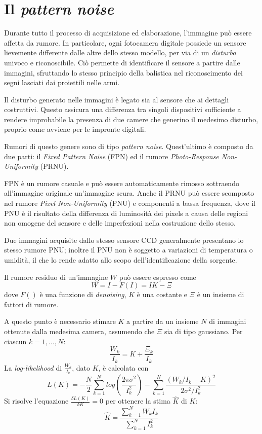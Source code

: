 \section{Il \emph{pattern noise}}

Durante tutto il processo di acquisizione ed elaborazione, l'immagine può essere affetta da rumore. 
In particolare, ogni fotocamera digitale possiede un sensore
lievemente differente dalle altre dello stesso modello, per via di un \emph{disturbo}
univoco e riconoscibile. Ciò permette di identificare il sensore a partire dalle
immagini, sfruttando lo stesso principio della balistica nel riconoscimento dei segni lasciati dai proiettili nelle armi.

Il disturbo generato nelle immagini è legato sia al sensore che ai dettagli costruttivi. Questo
assicura una differenza tra singoli dispositivi sufficiente a rendere improbabile
la presenza di due camere che generino il medesimo disturbo, proprio come avviene per le impronte digitali. 

Rumori di questo genere sono di tipo \emph{pattern noise}. Quest'ultimo è composto da due parti: il \emph{Fixed Pattern Noise} (FPN) ed il rumore \emph{Photo-Response Non-Uniformity} (PRNU).

FPN è un rumore casuale e può essere automaticamente rimosso sottraendo all'immagine originale un'immagine scura. Anche il PRNU può essere scomposto nel rumore \emph{Pixel Non-Uniformity} (PNU) e componenti a bassa frequenza, dove il PNU è il risultato della differenza di luminosità dei pixels a causa delle regioni non omogene del sensore e delle imperfezioni nella costruzione dello stesso.

Due immagini acquisite dallo stesso sensore CCD generalmente presentano lo stesso rumore PNU; inoltre il PNU non è soggetto a variazioni di temperatura o umidità, il che lo rende adatto allo scopo dell'identificazione della sorgente.

Il rumore residuo di un'immagine $W$ può essere espresso come
$$
W = I - F(I) = IK - \Xi
$$
dove $F()$ è una funzione di \emph{denoising}, $K$ è una costante e $\Xi$ è un insieme di fattori di rumore.

A questo punto è necessario stimare $K$ a partire da un insieme $N$ di immagini ottenute dalla medesima camera, assumendo che $\Xi$ sia di tipo gaussiano. Per ciascun $k = 1, \ldots, N$:
$$
\frac{W_k}{I_k} = K + \frac{\Xi_k}{I_k}
$$
La \emph{log-likelihood} di $\frac{W_k}{I_k}$, dato $K$, è calcolata con
$$
L(K) = -\frac{N}{2} \sum_{k = 1}^{N} log(\frac{2\pi\sigma^2}{I_{k}^{2}}) -  \sum_{k = 1}^{N} \frac{(W_k / I_k - K)^2}{2\sigma^2 / I_{k}^{2}}
$$
Si risolve l'equazione $\frac{\delta L(K)}{\delta K} = 0$ per ottenere la stima $\hat{K}$ di $K$:
$$
\hat{K} = \frac{\sum_{k = 1}^{N} W_k I_k}{\sum_{k = 1}^{N} I_{k}^{2}}
$$

